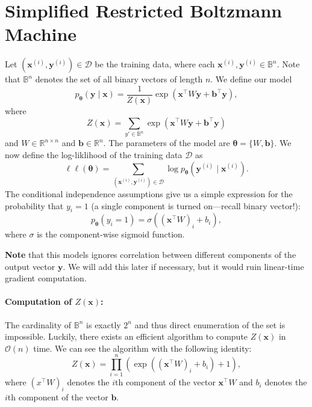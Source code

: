 \documentclass[12pt]{article}
\renewcommand{\vec}{\boldsymbol}   %
\newcommand{\x}{\vec{x}}
\newcommand{\y}{\vec{y}}
\renewcommand{\xi}{\vec{x}^{(i)}}
\newcommand{\yi}{\vec{y}^{(i)}}
\newcommand{\B}{\mathbb{B}}
\newcommand{\vtheta}{\vec{\theta}}
\begin{document}
\section{Simplified Restricted Boltzmann Machine}
Let $(\xi, \yi) \in \mathcal{D}$ be the training data, where each $\xi, \yi \in \B^n$.
Note that $\B^n$ denotes the set of all binary vectors of length $n$.
We define our model
\begin{equation}
p_{\vtheta}(\y \mid \x) = \frac{1}{Z(\x)} \exp\left(\x^{\top} W \y + \vec{b}^{\top}\y  \right),
\end{equation}
where
\begin{equation}
Z(\x) = \sum_{y' \in \mathbb{B}^n} \exp\left(\x^{\top} W \y + \vec{b}^{\top}\y  \right)
\end{equation}
and $W \in \mathbb{R}^{n \times n}$ and $\vec{b} \in \mathbb{R}^n$.
The parameters of the model are $\vtheta = \{W, \vec{b}\}$.
We now define the log-liklihood of the training data $\mathcal{D}$
as
\begin{equation}
  \ell\ell(\vtheta) = \sum_{(\xi, \yi) \in \mathcal{D}} \log p_{\vtheta}(\yi \mid \xi).
\end{equation}
The conditional independence assumptions give us a simple expression
for the probability that $y_i = 1$ (a single component is turned on---recall binary vector!):
\begin{equation}
  p_{\vtheta}(y_i = 1) = \sigma( (\x^{\top}W)_i + b_i),
\end{equation}
where $\sigma$ is the component-wise sigmoid function. 

{\bf Note} that this models ignores correlation between different
components of the output vector $\y$. We will add this later
if necessary, but it would ruin linear-time gradient computation. 



\paragraph{Computation of $Z(\x)$:} The cardinality of $\B^n$ is exactly $2^n$
and thus direct enumeration of the set is impossible. Luckily, there exists
an efficient algorithm to compute $Z(\x)$ in $\mathcal{O}(n)$ time. We can see the algorithm with the following identity:
\begin{equation}
 Z(\x) = \prod_{i=1}^{n} \left(\exp\left( (\x^{\top}W)_i + b_i \right) + 1\right),
\end{equation}
where $(x^{\top}W)_i$ denotes the $i$th component of the vector $\x^{\top}W$
and $b_i$ denotes the $i$th component of the vector $\vec{b}$.
\end{document}

